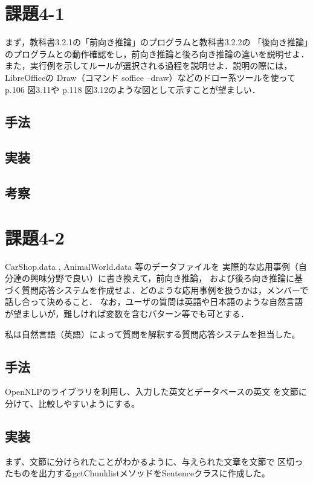 \documentclass{jarticle}
\begin{document}
\section{課題4-1}
\begin{screen}
    まず，教科書3.2.1の「前向き推論」のプログラムと教科書3.2.2の
    「後向き推論」のプログラムとの動作確認をし，前向き推論と後ろ向き推論の違いを説明せよ．
    また，実行例を示してルールが選択される過程を説明せよ．説明の際には，LibreOfficeの
    Draw（コマンド soffice --draw）などのドロー系ツールを使ってp.106 図3.11や
    p.118 図3.12のような図として示すことが望ましい．
\end{screen}
\subsection{手法}
    
\subsection{実装}
    
\subsection{考察}
    
\section{課題4-2}
\begin{screen}
    CarShop.data , AnimalWorld.data 等のデータファイルを
    実際的な応用事例（自分達の興味分野で良い）に書き換えて，前向き推論，
    および後ろ向き推論に基づく質問応答システムを作成せよ．どのような応用事例を扱うかは，メンバーで話し合って決めること．
    なお，ユーザの質問は英語や日本語のような自然言語が望ましいが，難しければ変数を含むパターン等でも可とする．
\end{screen}
    私は自然言語（英語）によって質問を解釈する質問応答システムを担当した。
\subsection{手法}
    OpenNLPのライブラリを利用し、入力した英文とデータベースの英文
    を文節に分けて、比較しやすいようにする。
\subsection{実装}
    まず、文節に分けられたことがわかるように、与えられた文章を文節で
    区切ったものを出力するgetChunklistメソッドをSentenceクラスに作成した。
\end{document}
